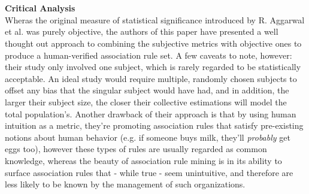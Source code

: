 \\\\\textbf{Critical Analysis}\\
Wheras the original measure of statistical significance introduced by R. Aggarwal et al.  was purely objective, the authors  of this paper have presented a well thought out approach to combining the subjective metrics with objective ones to produce a human-verified association rule set.  A few caveats to note, however: their study only involved one subject, which is rarely regarded to be statistically acceptable. An ideal study would require multiple, randomly chosen subjects to offset any bias that the singular subject would have had, and in addition, the larger their subject size, the closer their collective estimations will model the total population's.  Another drawback of their approach is that by using human intuition as a metric,  they're promoting association rules that satisfy pre-existing notions about human behavior (e.g. if someone buys milk, they'll \textit{probably} get eggs too), however these types of rules are usually regarded as common knowledge,  whereas the beauty of association rule mining is in its ability to surface association rules that - while true - seem unintuitive, and therefore are less likely to be known by the management of such organizations.


